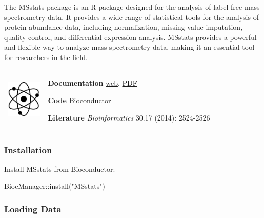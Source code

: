 \documentclass[
]{book}
\newenvironment{Shaded}{\begin{snugshade}}{\end{snugshade}}
\newcommand{\FunctionTok}[1]{\textcolor[rgb]{0.00,0.00,0.00}{#1}}
\newcommand{\NormalTok}[1]{#1}
\newcommand{\SpecialCharTok}[1]{\textcolor[rgb]{0.00,0.00,0.00}{#1}}
\newcommand{\StringTok}[1]{\textcolor[rgb]{0.31,0.60,0.02}{#1}}
\begin{document}
The MSstats package is an R package designed for the analysis of label-free mass spectrometry data. It provides a wide range of statistical tools for the analysis of protein abundance data, including normalization, missing value imputation, quality control, and differential expression analysis. MSstats provides a powerful and flexible way to analyze mass spectrometry data, making it an essential tool for researchers in the field.

\hfill\break

\begin{longtable}[]{@{}
  >{\raggedright\arraybackslash}p{}
  >{\raggedright\arraybackslash}p{}@{}}
\toprule\noalign{}
\endhead
\bottomrule\noalign{}
\endlastfoot
\includegraphics[width=\textwidth,height=0.70833in]{images/05.png} & \textbf{Documentation} \textbar{} \href{https://msstats.org}{web}, \href{https://bioconductor.org/packages/release/bioc/manuals/MSstats/man/MSstats.pdf}{PDF}

\textbf{Code} \textbar{} \href{https://www.bioconductor.org/packages/release/bioc/html/MSstats.html}{Bioconductor}

\textbf{Literature} \textbar{} \emph{Bioinformatics} 30.17 (2014): 2524-2526 \\
\end{longtable}

\hfill\break

\hypertarget{installation-3}{%
\subsubsection*{Installation}\label{installation-3}}

Install MSstats from Bioconductor:

\begin{Shaded}
\begin{Highlighting}[]
\NormalTok{BiocManager}\SpecialCharTok{::}\FunctionTok{install}\NormalTok{(}\StringTok{"MSstats"}\NormalTok{)}
\end{Highlighting}
\end{Shaded}

\hypertarget{loading-data}{%
\subsubsection*{Loading Data}\label{loading-data}}
\end{document}
